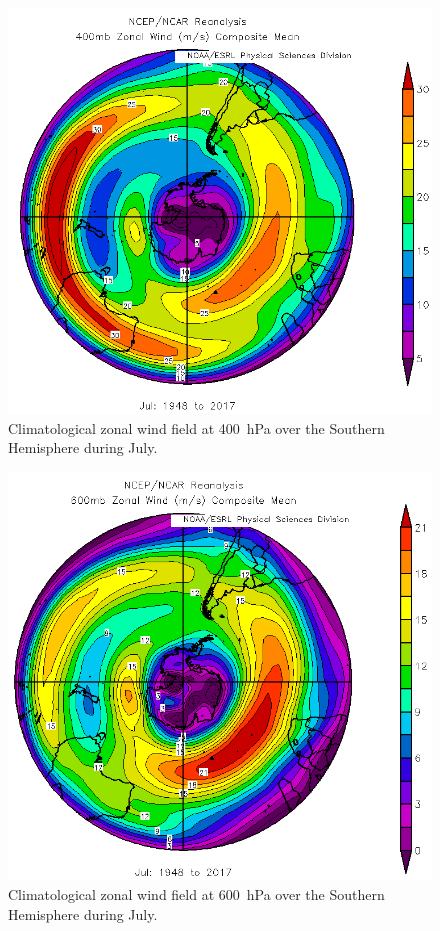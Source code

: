\documentclass[11pt]{article}
\begin{document}
\begin{figure}[h!]
	\centering
	\includegraphics[width=\textwidth]{400hPa_zonal_wind_July_SH.png}
	\caption{Climatological zonal wind field at \SI{400}{\hecto\Pa} over the Southern Hemisphere during July.}
	\label{fig:400hPa_zonal_wind_July_SH}
\end{figure}

\begin{figure}[h!]
	\centering
	\includegraphics[width=\textwidth]{600hPa_zonal_wind_July_SH.png}
	\caption{Climatological zonal wind field at \SI{600}{\hecto\Pa} over the Southern Hemisphere during July.}
	\label{fig:600hPa_zonal_wind_July_SH}
\end{figure}
\end{document}
